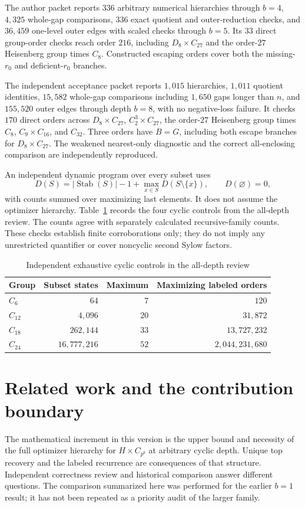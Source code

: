 \documentclass[11pt,letterpaper]{article}
\theoremstyle{definition}\newtheorem{definition}{Definition}
\newcommand{\Stab}{\operatorname{Stab}}
\begin{document}
The author packet reports $336$ arbitrary numerical hierarchies through $b=4$, $4{,}325$ whole-gap comparisons, $336$ exact quotient and outer-reduction checks, and $36{,}459$ one-level outer edges with scaled checks through $b=5$. Its $33$ direct group-order checks reach order $216$, including $D_8\times C_{27}$ and the order-$27$ Heisenberg group times $C_8$. Constructed escaping orders cover both the missing-$r_0$ and deficient-$r_0$ branches.

The independent acceptance packet reports $1{,}015$ hierarchies, $1{,}011$ quotient identities, $15{,}582$ whole-gap comparisons including $1{,}650$ gaps longer than $n$, and $155{,}520$ outer edges through depth $b=8$, with no negative-loss failure. It checks $170$ direct orders across $D_8\times C_{27}$, $C_2^3\times C_{27}$, the order-$27$ Heisenberg group times $C_8$, $C_9\times C_{16}$, and $C_{32}$. Three orders have $B=G$, including both escape branches for $D_8\times C_{27}$. The weakened nearest-only diagnostic and the correct all-enclosing comparison are independently reproduced.

An independent dynamic program over every subset uses
\[
D(S)=|\Stab(S)|-1+\max_{x\in S}D(S\setminus\{x\}),\qquad D(\varnothing)=0,
\]
with counts summed over maximizing last elements. It does not assume the optimizer hierarchy. Table~\ref{tab:controls} records the four cyclic controls from the all-depth review. The counts agree with separately calculated recursive-family counts. These checks establish finite corroborations only; they do not imply any unrestricted quantifier or cover noncyclic second Sylow factors.

\begin{table}[htbp]\centering
\caption{Independent exhaustive cyclic controls in the all-depth review}\label{tab:controls}
\begin{tabular}{lrrr}\toprule
Group & Subset states & Maximum & Maximizing labeled orders\\\midrule
$C_6$ & $64$ & $7$ & $120$\\
$C_{12}$ & $4{,}096$ & $20$ & $31{,}872$\\
$C_{18}$ & $262{,}144$ & $33$ & $13{,}727{,}232$\\
$C_{24}$ & $16{,}777{,}216$ & $52$ & $2{,}044{,}231{,}680$\\\bottomrule
\end{tabular}\end{table}

\section{Related work and the contribution boundary}\label{sec:related}
The mathematical increment in this version is the upper bound and necessity of the full optimizer hierarchy for $H\times C_{p^b}$ at arbitrary cyclic depth. Unique top recovery and the labeled recurrence are consequences of that structure. Independent correctness review and historical comparison answer different questions. The comparison summarized here was performed for the earlier $b=1$ result; it has not been repeated as a priority audit of the larger family.
\end{document}
